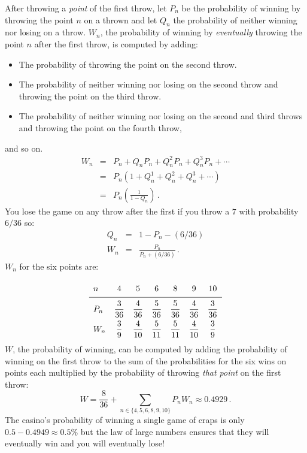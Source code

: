 After throwing a \emph{point} of the first throw, let $P_n$ be the probability of winning by throwing the point $n$ on a thrown and let $Q_n$ the probability of neither winning nor losing on a throw. $W_n$, the probability of winning by \emph{eventually} throwing the point $n$ after the first throw, is computed by adding:
\begin{itemize}
\item The probability of throwing the point on the second throw.
\item The probability of neither winning nor losing on the second throw and throwing the point on the third throw.
\item The probability of neither winning nor losing on the second and third throws and throwing the point on the fourth throw,
\end{itemize}
and so on.
\begin{eqnarray*}
W_n&=&P_n + Q_n P_n + Q_n^2 P_n+ Q_n^3 P_n  + \cdots\\
&=&P_n\left(1+Q_n^1 + Q_n^2+ Q_n^3  + \cdots\right)\\
&=&P_n\left(\frac{1}{1-Q_n}\right)\,.
\end{eqnarray*}
You lose the game on any throw after the first if you throw a $7$ with probability $6/36$ so:
\begin{eqnarray*}
Q_n &=& 1-P_n-(6/36)\\
W_n&=&\frac{P_n}{P_n+(6/36)}\,.
\end{eqnarray*}
$W_n$ for the six points are:
\[
\renewcommand{\arraystretch}{2}
\begin{array}{lcccccc}
n   & 4 & 5 & 6 & 8 & 9 & 10 \\\hline
P_n & \disfrac{3}{36} & \disfrac{4}{36} & \disfrac{5}{36} & \disfrac{5}{36} & \disfrac{4}{36} & \disfrac{3}{36} \\
W_n & \disfrac{3}{9} & \disfrac{4}{10} & \disfrac{5}{11} & \disfrac{5}{11} & \disfrac{4}{10} & \disfrac{3}{9}
\end{array}
\]
$W$, the probability of winning, can be computed by adding the probability of winning on the first throw to the sum of the probabilities for the six wins on points each multiplied by the probability of throwing \emph{that point} on the first throw:
\begin{equation}\label{eq.9-a}
W=\frac{8}{36}+\sum_{n\in\{4,5,6,8,9,10\}} P_nW_n \approx 0.4929\,.
\end{equation}
The casino's probability of winning a single game of craps is
only $0.5-0.4949\approx 0.5\%$ but the law of large numbers ensures that they will eventually win and you will eventually lose!

